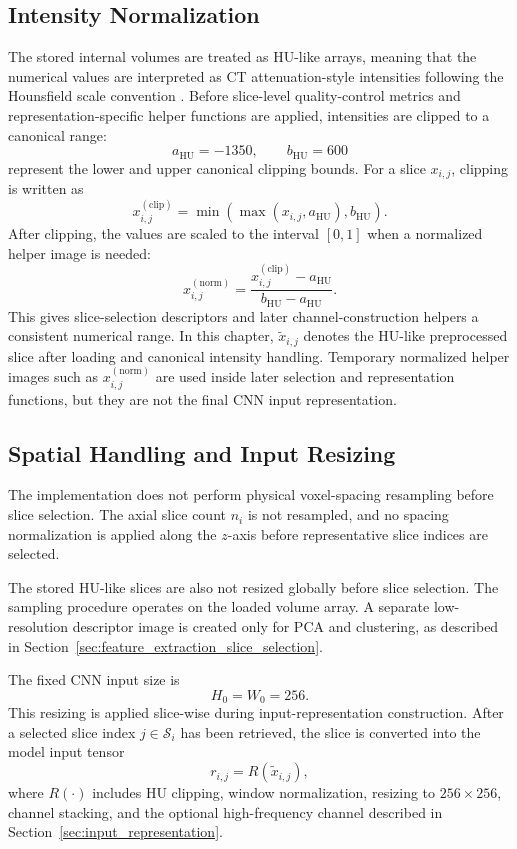 \subsection{Intensity Normalization}
\label{sec:intensity_normalization}

The stored internal volumes are treated as HU-like arrays, meaning that the numerical values are interpreted as CT attenuation-style intensities following the Hounsfield scale convention \cite{hounsfield1973computerized}. Before slice-level quality-control metrics and representation-specific helper functions are applied, intensities are clipped to a canonical range:
\[
a_{\mathrm{HU}} = -1350,
\qquad
b_{\mathrm{HU}} = 600
\]
represent the lower and upper canonical clipping bounds. For a slice \(x_{i,j}\), clipping is written as
\[
x^{(\mathrm{clip})}_{i,j}
=
\min\!\left(\max\!\left(x_{i,j}, a_{\mathrm{HU}}\right), b_{\mathrm{HU}}\right).
\]
After clipping, the values are scaled to the interval \([0,1]\) when a normalized helper image is needed:
\[
x^{(\mathrm{norm})}_{i,j}
=
\frac{x^{(\mathrm{clip})}_{i,j} - a_{\mathrm{HU}}}
{b_{\mathrm{HU}} - a_{\mathrm{HU}}}.
\]
This gives slice-selection descriptors and later channel-construction helpers a consistent numerical range. In this chapter, \(\tilde{x}_{i,j}\) denotes the HU-like preprocessed slice after loading and canonical intensity handling. Temporary normalized helper images such as \(x^{(\mathrm{norm})}_{i,j}\) are used inside later selection and representation functions, but they are not the final CNN input representation.


\subsection{Spatial Handling and Input Resizing}
\label{sec:spatial_handling_input_resizing}

The implementation does not perform physical voxel-spacing resampling before slice selection. The axial slice count \(n_i\) is not resampled, and no spacing normalization is applied along the \(z\)-axis before representative slice indices are selected.

The stored HU-like slices are also not resized globally before slice selection. The sampling procedure operates on the loaded volume array. A separate low-resolution descriptor image is created only for PCA and clustering, as described in Section~\ref{sec:feature_extraction_slice_selection}.

The fixed CNN input size is
\[
H_0 = W_0 = 256.
\]
This resizing is applied slice-wise during input-representation construction. After a selected slice index \(j \in \mathcal{S}_i\) has been retrieved, the slice is converted into the model input tensor
\[
r_{i,j}
=
R(\tilde{x}_{i,j}),
\]
where \(R(\cdot)\) includes HU clipping, window normalization, resizing to \(256 \times 256\), channel stacking, and the optional high-frequency channel described in Section~\ref{sec:input_representation}.



